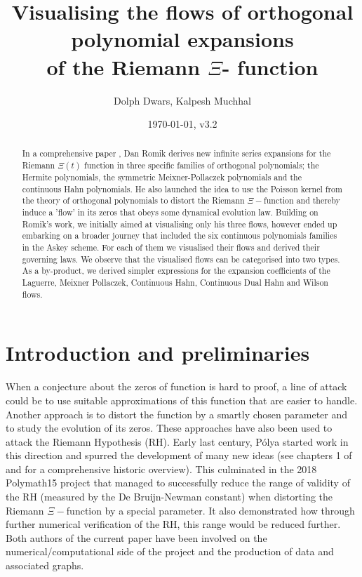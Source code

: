 \documentclass[a4paper,11pt,twoside]{amsart}
\title[Visualising the flows of orthogonal polynomial expansions of the Riemann $\Xi$-function]{Visualising the flows of orthogonal polynomial expansions \\ of the Riemann $\Xi$- function}
\author{Dolph Dwars, Kalpesh Muchhal}
\date{\today, v3.2}
\begin{document}
\begin{abstract}
In a comprehensive paper \cite{rom}, Dan Romik derives new infinite series expansions for the Riemann $\Xi(t)$ function in three specific families of orthogonal polynomials; the Hermite polynomials, the symmetric Meixner-Pollaczek polynomials and the continuous Hahn polynomials. He also launched the idea to use the Poisson kernel from the theory of orthogonal polynomials to distort the Riemann $\Xi-$function and thereby induce a 'flow' in its zeros that obeys some dynamical evolution law. Building on Romik's work, we initially aimed at visualising only his three flows, however ended up embarking on a broader journey that included the six continuous polynomials families in the Askey scheme. For each of them we visualised their flows and derived their governing laws. We observe that the visualised flows can be categorised into two types. As a by-product, we derived simpler expressions for the expansion coefficients of the Laguerre, Meixner Pollaczek, Continuous Hahn, Continuous Dual Hahn and Wilson flows.  
\end{abstract}

\maketitle

\section{Introduction and preliminaries}

When a conjecture about the zeros of function is hard to proof, a line of attack could be to use suitable approximations of this function that are easier to handle. Another approach is to distort the function by a smartly chosen parameter and to study the evolution of its zeros. These approaches have also been used to attack the Riemann Hypothesis (RH). Early last century, Pólya started work in this direction and spurred the development of many new ideas (see chapters 1 of \cite{rom} and \cite{pol} for a comprehensive historic overview). This culminated in the 2018 Polymath15 project \cite{pol} that managed to successfully reduce the range of validity of the RH (measured by the De Bruijn-Newman constant) when distorting the Riemann $\Xi-$function by a special parameter. It also demonstrated how through further numerical verification of the RH, this range would be reduced further. Both authors of the current paper have been involved on the numerical/computational side of the project and the production of data and associated graphs. 
\end{document}
